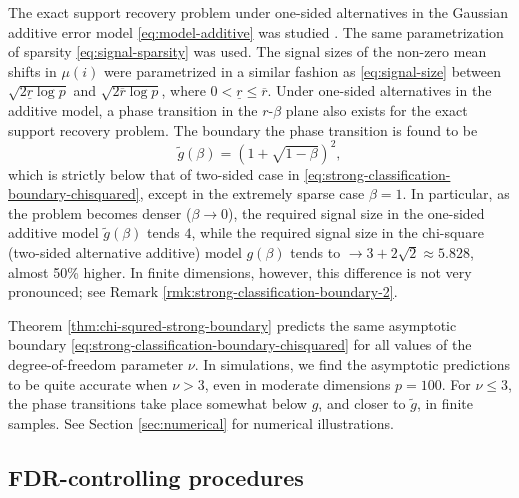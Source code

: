 \begin{remark} \label{rmk:strong-classification-boundary-1}
The exact support recovery problem under one-sided alternatives in the Gaussian additive error model \eqref{eq:model-additive} was studied \cite{gao2018fundamental}.
The same parametrization of sparsity \eqref{eq:signal-sparsity} was used.
The signal sizes of the non-zero mean shifts in $\mu(i)$ were parametrized in a similar fashion as \eqref{eq:signal-size} between $\sqrt{2\underline{r}\log{p}}$ and $\sqrt{2\overline{r}\log{p}}$, where $0<\underline{r}\le\overline{r}$.
Under one-sided alternatives in the additive model, a phase transition in the $r$-$\beta$ plane also exists for the exact support recovery problem. The boundary the phase transition is found to be
\begin{equation} \label{eq:strong-classification-boundary-additive}
    \widetilde{g}(\beta) = \left(1 + \sqrt{1-\beta}\right)^2,
\end{equation}
which is strictly below that of two-sided case in \eqref{eq:strong-classification-boundary-chisquared}, except in the extremely sparse case $\beta = 1$.
In particular, as the problem becomes denser ($\beta\to0$), the required signal size in the one-sided additive model $\widetilde{g}(\beta)$ tends $4$, while the required signal size in the chi-square (two-sided alternative additive) model ${g}(\beta)$ tends to $\to3+2\sqrt{2}\approx 5.828$, almost 50\% higher.
In finite dimensions, however, this difference is not very pronounced; see Remark \ref{rmk:strong-classification-boundary-2}.
\end{remark}

\begin{remark} \label{rmk:strong-classification-boundary-2}
Theorem \ref{thm:chi-squred-strong-boundary} predicts the same asymptotic boundary \eqref{eq:strong-classification-boundary-chisquared} for all values of the degree-of-freedom parameter $\nu$.
In simulations, we find the asymptotic predictions to be quite accurate when $\nu>3$, even in moderate dimensions $p=100$. 
For $\nu\le3$, the phase transitions take place somewhat below ${g}$, and closer to $\widetilde{g}$, in finite samples.
See Section \ref{sec:numerical} for numerical illustrations.
\end{remark}

\subsection{FDR-controlling procedures}
\label{subsec:FDR-controlling-procedures}

